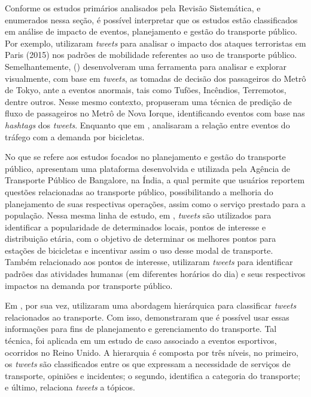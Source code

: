 \documentclass[
	12pt,				%
	oneside,			%
	a4paper,			%
	english,			%
	brazil				%
	]{abntex2ppgsi}
\begin{document}
Conforme os estudos primários analisados pela Revisão Sistemática, e enumerados nessa seção, é possível interpretar que os estudos estão classificados em análise de impacto de eventos, planejamento e gestão do transporte público. Por exemplo, \cite{Wen2016} utilizaram \textit{tweets} para analisar o impacto dos ataques terroristas em Paris (2015) nos padrões de mobilidade referentes ao uso de transporte público. Semelhantemente, \citeauthor{Itoh2016} (\citeyear{Itoh2016}) desenvolveram uma ferramenta para analisar e explorar visualmente, com base em \textit{tweets}, as tomadas de decisão dos passageiros do Metrô de Tokyo, ante a eventos anormais, tais como Tufões, Incêndios, Terremotos, dentre outros. Nesse mesmo contexto, \cite{Ni2016} propuseram uma técnica de predição de fluxo de passageiros no Metrô de Nova Iorque, identificando eventos com base nas \textit{hashtags} dos \textit{tweets}. Enquanto que em \cite{Chen2016}, analisaram a relação entre eventos do tráfego com a demanda por bicicletas.

No que se refere aos estudos focados no planejamento e gestão do transporte público, \cite{Mukherjee2015} apresentam uma plataforma desenvolvida e utilizada pela Agência de Transporte Público de Bangalore, na Índia, a qual permite que usuários reportem questões relacionadas ao transporte  público, possibilitando a melhoria do planejamento de suas respectivas operações, assim como o serviço prestado para a população. Nessa mesma linha de estudo, em \cite{Gutev2016}, \textit{tweets} são utilizados para identificar a popularidade de determinados locais, pontos de interesse e distribuição etária, com o objetivo de determinar os melhores pontos para estações de bicicletas e incentivar assim o uso desse modal de transporte. Também relacionado aos pontos de interesse, \cite{Maghrebi2015} utilizaram \textit{tweets} para identificar padrões das atividades humanas (em diferentes horários do dia) e seus respectivos impactos na demanda por transporte público.

Em \cite{Gal-Tzur2014}, por sua vez, utilizaram uma abordagem hierárquica para classificar \textit{tweets} relacionados ao transporte. Com isso, demonstraram que é possível usar essas informações para fins de planejamento e gerenciamento do transporte. Tal técnica, foi aplicada em um estudo de caso associado a eventos esportivos, ocorridos no Reino Unido. A hierarquia é composta por três níveis, no primeiro, os \textit{tweets} são classificados entre os que expressam a necessidade de serviços de transporte, opiniões e incidentes; o segundo, identifica a categoria do transporte; e último, relaciona \textit{tweets} a tópicos. 
\end{document}
